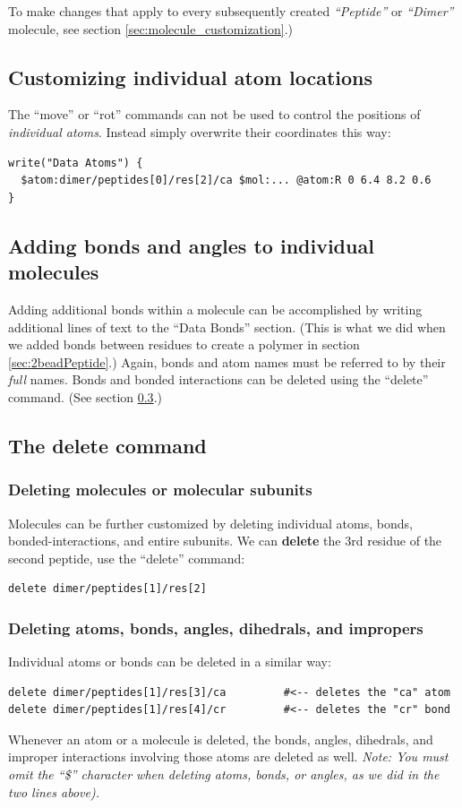 \documentclass[11pt]{article}
\begin{document}
To make changes that apply to every subsequently created \textit{``Peptide''} or
\textit{``Dimer''} molecule, see section \ref{sec:molecule_customization}.)


\subsection{Customizing individual atom locations}
\label{sec:custom_atom}
The ``move'' or ``rot'' commands can not be used to control the positions
of \textit{individual atoms}.
Instead simply overwrite their coordinates this way:
\begin{verbatim}
write("Data Atoms") {
  $atom:dimer/peptides[0]/res[2]/ca $mol:... @atom:R 0 6.4 8.2 0.6
}
\end{verbatim}

\subsection{Adding bonds and angles to individual molecules}
\label{sec:adding_atoms_bonds}
Adding additional bonds within a molecule can be accomplished
by writing additional lines of text to the ``Data Bonds'' section.
(This is what we did when we added bonds between residues to create a polymer
 in section \ref{sec:2beadPeptide}.)
Again, bonds and atom names must be referred to by their \textit{full} names.
Bonds and bonded interactions can be deleted using the ``delete'' command.
(See section \ref{sec:delete}.)


\subsection{The \textbf{delete} command}
\label{sec:delete}

\subsubsection{Deleting molecules or molecular subunits}
Molecules can be further customized by deleting 
individual atoms, bonds, bonded-interactions, and entire subunits.
We can \textbf{delete} the 3rd residue of the second peptide, 
use the ``delete'' command:
\begin{verbatim}
delete dimer/peptides[1]/res[2]
\end{verbatim}

\subsubsection{Deleting atoms, bonds, angles, dihedrals, and impropers}
\label{sec:delete_atoms_bonds}
Individual atoms or bonds can be deleted in a similar way:
\begin{verbatim}
delete dimer/peptides[1]/res[3]/ca         #<-- deletes the "ca" atom
delete dimer/peptides[1]/res[4]/cr         #<-- deletes the "cr" bond
\end{verbatim}
Whenever an atom or a molecule is deleted, the bonds, angles, dihedrals, 
and improper interactions involving those atoms are deleted as well.
\textit{Note: You must omit the ``\$'' character when deleting atoms,
bonds, or angles, as we did in the two lines above).}
\end{document}

